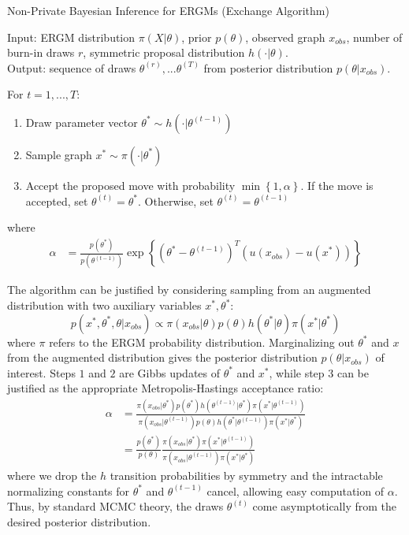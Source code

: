 \begin{algorithm}
	\caption{Non-Private Bayesian Inference for ERGMs (Exchange Algorithm) \cite{CF11} }
	Input: ERGM distribution $\pi(X | \theta)$, prior $p(\theta)$, observed graph $x_{obs}$, number of burn-in draws $r$, symmetric proposal distribution $h(\cdot | \theta)$. \\
	Output: sequence of draws $\theta^{(r)},...\theta^{(T)}$ from posterior distribution $p(\theta | x_{obs})$.
	
	\vspace{0.1in}
	For {$ t = 1,...,T$}:
	\begin{enumerate}
		\item  Draw parameter vector $\theta^* \sim h(\cdot | \theta^{(t-1)})$
		\item Sample graph $x^* \sim \pi(\cdot | \theta^*)$
		\item Accept the proposed move with probability $\min\left\{1, \alpha\right\}$. If the move is accepted, set $\theta^{(t)} = \theta^*$. Otherwise, set $\theta^{(t)} = \theta^{(t-1)}$
	\end{enumerate}
	where \begin{align*}
	\alpha &= \frac{p(\theta^*)}{p(\theta^{(t-1)})} \exp\left\{\left(\theta^* - \theta^{(t-1)}\right)^T\left(u(x_{obs}) - u(x^*)\right) \right\}
	\end{align*}
\end{algorithm}

The algorithm can be justified by considering sampling from an augmented distribution with two auxiliary variables $x^*, \theta^*$:
$$p(x^*, \theta^*, \theta | x_{obs}) \propto \pi(x_{obs} | \theta)p(\theta) h(\theta^* | \theta) \pi(x^* | \theta^*) $$
where $\pi$ refers to the ERGM probability distribution. Marginalizing out $\theta^*$ and $x$ from the augmented distribution gives the posterior distribution $p(\theta | x_{obs})$ of interest. Steps $1$ and $2$ are Gibbs updates of $\theta^*$ and $x^*$, while step $3$ can be justified as the appropriate Metropolis-Hastings acceptance ratio:
\begin{align*}
\alpha & = \frac{ \pi(x_{obs} | \theta^*)p(\theta^*) h(\theta^{(t-1)}| \theta^*) \pi(x^* | \theta^{(t-1)})  } { \pi(x_{obs} | \theta^{(t-1)})p(\theta) h(\theta^* | \theta{^{(t-1)}})   \pi(x^* | \theta^*)  } \\
& = \frac{p(\theta^*)}{p(\theta)} \frac{\pi(x_{obs} | \theta^*) \pi(x^* | \theta^{(t-1)})}{ \pi(x_{obs} | \theta^{(t-1)}) \pi(x^* | \theta^*) }
\end{align*}
where we drop the $h$ transition probabilities by symmetry and the intractable normalizing constants for $\theta^*$ and $\theta^{(t-1)}$ cancel, allowing easy computation of $\alpha$. Thus, by standard MCMC theory, the draws $\theta^{(t)}$ come asymptotically from the desired posterior distribution.

